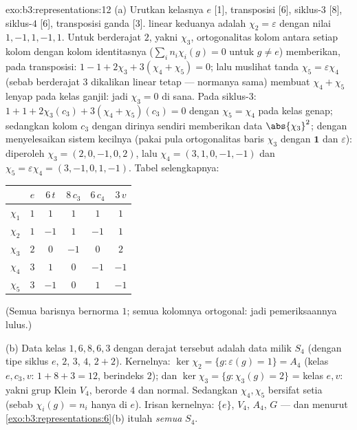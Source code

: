 \begin{solution}{exo:b3:representations:12}
(a) Urutkan kelasnya $e$ [1], transposisi [6],
siklus-$3$ [8], siklus-$4$ [6], transposisi ganda [3].
 linear keduanya adalah $\chi_2 = \varepsilon$ dengan
nilai $1, -1, 1, -1, 1$. Untuk  berderajat $2$, yakni
$\chi_3$, ortogonalitas kolom antara setiap kolom dengan
kolom identitasnya ($\sum_in_i\chi_i(g) = 0$ untuk $g \neq e$)
memberikan, pada transposisi: $1 - 1 + 2\chi_3 + 3(\chi_4 +
\chi_5) = 0$; lalu muslihat tanda $\chi_5 = \varepsilon\chi_4$
(sebab  berderajat $3$ dikalikan  linear tetap
 --- normanya sama) membuat $\chi_4 + \chi_5$ lenyap pada
kelas ganjil: jadi $\chi_3 = 0$ di sana. Pada siklus-$3$: $1 + 1 +
2\chi_3(c_3) + 3(\chi_4 + \chi_5)(c_3) = 0$ dengan
$\chi_5 = \chi_4$ pada kelas genap; sedangkan kolom $c_3$ dengan
dirinya sendiri memberikan data $\abs{\chi_3}^2$; dengan menyelesaikan sistem kecilnya
(pakai pula ortogonalitas baris $\chi_3$ dengan $\mathbf 1$ dan
$\varepsilon$): diperoleh $\chi_3 = (2, 0, -1, 0, 2)$, lalu $\chi_4 =
(3, 1, 0, -1, -1)$ dan $\chi_5 = \varepsilon\chi_4 = (3, -1,
0, 1, -1)$. Tabel selengkapnya:
\begin{center}
\begin{tabular}{c|ccccc}
 & $e$ & $6\,t$ & $8\,c_3$ & $6\,c_4$ & $3\,v$\\
\hline
$\chi_1$ & $1$ & $1$ & $1$ & $1$ & $1$\\
$\chi_2$ & $1$ & $-1$ & $1$ & $-1$ & $1$\\
$\chi_3$ & $2$ & $0$ & $-1$ & $0$ & $2$\\
$\chi_4$ & $3$ & $1$ & $0$ & $-1$ & $-1$\\
$\chi_5$ & $3$ & $-1$ & $0$ & $1$ & $-1$\\
\end{tabular}
\end{center}
(Semua barisnya bernorma $1$; semua kolomnya ortogonal:
jadi pemeriksaannya lulus.)

(b) Data kelas $1, 6, 8, 6, 3$ dengan derajat tersebut adalah data
milik $S_4$ (dengan tipe siklus $e$, $2$, $3$, $4$, $2{+}2$).
Kernelnya: $\ker\chi_2 = \{g : \varepsilon(g) = 1\} = A_4$
(kelas $e, c_3, v$: $1 + 8 + 3 = 12$, berindeks $2$);
dan $\ker\chi_3 = \{g : \chi_3(g) = 2\}$ = kelas $e, v$: yakni
grup Klein $V_4$, berorde $4$ dan normal. Sedangkan $\chi_4, \chi_5$
bersifat setia (sebab $\chi_i(g) = n_i$ hanya di $e$). Irisan
kernelnya: $\{e\}$, $V_4$, $A_4$, $G$ --- dan menurut
\cref{exo:b3:representations:6}(b) itulah \emph{semua}
 $S_4$.


\end{solution}
